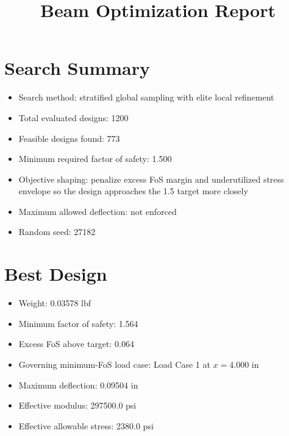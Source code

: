 \documentclass[11pt]{article}
\title{Beam Optimization Report}
\date{}
\begin{document}
\maketitle

\section*{Search Summary}
\begin{itemize}
\item Search method: stratified global sampling with elite local refinement
\item Total evaluated designs: 1200
\item Feasible designs found: 773
\item Minimum required factor of safety: 1.500
\item Objective shaping: penalize excess FoS margin and underutilized stress envelope so the design approaches the 1.5 target more closely
\item Maximum allowed deflection: not enforced
\item Random seed: 27182
\end{itemize}

\section*{Best Design}
\begin{itemize}
\item Weight: 0.03578 lbf
\item Minimum factor of safety: 1.564
\item Excess FoS above target: 0.064
\item Governing minimum-FoS load case: Load Case 1 at $x=4.000$ in
\item Maximum deflection: 0.09504 in
\item Effective modulus: 297500.0 psi
\item Effective allowable stress: 2380.0 psi
\end{itemize}
\end{document}
